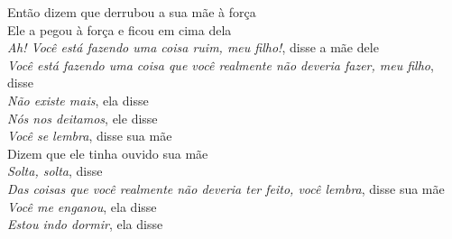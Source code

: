 \begin{linenumbers}\begingroup\raggedright
\noindent Então dizem que derrubou a sua mãe à força\\
Ele a pegou à força e ficou em cima dela\\
\emph{Ah! Você está fazendo uma coisa ruim, meu filho!}, disse a mãe dele\\
\emph{Você está fazendo uma coisa que você realmente não deveria fazer, meu filho}, disse\\
\emph{Não existe mais}, ela disse\\
\emph{Nós nos deitamos}, ele disse\\
\emph{Você se lembra}, disse sua mãe\\
Dizem que ele tinha ouvido sua mãe\\
\emph{Solta, solta}, disse\\
\emph{Das coisas que você realmente não deveria ter feito, você lembra}, disse sua mãe\\
\emph{Você me enganou}, ela disse\\
\emph{Estou indo dormir}, ela disse
\end{linenumbers}\endgroup

\bigskip

